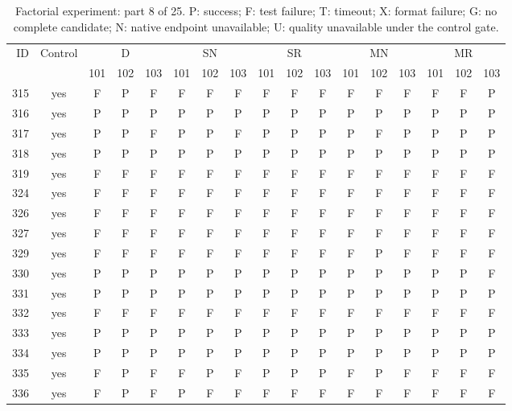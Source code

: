 \begin{table}[p]\centering\footnotesize
\setlength{\tabcolsep}{3pt}
\caption{Factorial experiment: part 8 of 25. P: success; F: test failure; T: timeout; X: format failure; G: no complete candidate; N: native endpoint unavailable; U: quality unavailable under the control gate.}
\begin{tabular*}{\textwidth}{@{\extracolsep{\fill}}rcccccccccccccccc}\toprule
ID & Control & \multicolumn{3}{c}{D} & \multicolumn{3}{c}{SN} & \multicolumn{3}{c}{SR} & \multicolumn{3}{c}{MN} & \multicolumn{3}{c}{MR}\\
\cmidrule(lr){3-5}\cmidrule(lr){6-8}\cmidrule(lr){9-11}\cmidrule(lr){12-14}\cmidrule(lr){15-17}
 & & 101 & 102 & 103 & 101 & 102 & 103 & 101 & 102 & 103 & 101 & 102 & 103 & 101 & 102 & 103\\\midrule
315 & yes & F & P & F & F & F & F & F & F & F & F & F & F & F & F & P\\
316 & yes & P & P & P & P & P & P & P & P & P & P & P & P & P & P & P\\
317 & yes & P & P & F & P & P & F & P & P & P & P & F & P & P & P & P\\
318 & yes & P & P & P & P & P & P & P & P & P & P & P & P & P & P & P\\
319 & yes & F & F & F & F & F & F & F & F & F & F & F & F & F & F & F\\
324 & yes & F & F & F & F & F & F & F & F & F & F & F & F & F & F & F\\
326 & yes & F & F & F & F & F & F & F & F & F & F & F & F & F & F & F\\
327 & yes & F & F & F & F & F & F & F & F & F & F & F & F & F & F & F\\
329 & yes & F & F & F & F & F & F & F & F & F & F & P & F & F & F & F\\
330 & yes & P & P & P & P & P & P & P & P & P & P & P & P & P & P & F\\
331 & yes & P & P & P & P & P & P & P & P & P & P & P & P & P & P & P\\
332 & yes & F & F & F & F & F & F & F & F & F & F & F & F & F & F & F\\
333 & yes & P & P & P & P & P & P & P & P & P & P & P & P & P & P & P\\
334 & yes & P & P & P & P & P & P & P & P & P & P & P & P & P & P & P\\
335 & yes & F & P & F & F & P & F & P & P & P & F & P & F & F & F & F\\
336 & yes & F & P & F & P & F & F & F & F & F & F & F & F & F & F & F\\

\end{tabular*}
\end{table}
